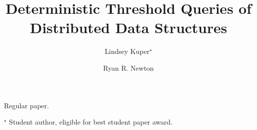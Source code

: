 

\title{Deterministic Threshold Queries of Distributed Data Structures}
\author{Lindsey Kuper$^\star$ \and Ryan R. Newton}


\maketitle


Regular paper.

$^\star$ Student author, eligible for best student paper award.
